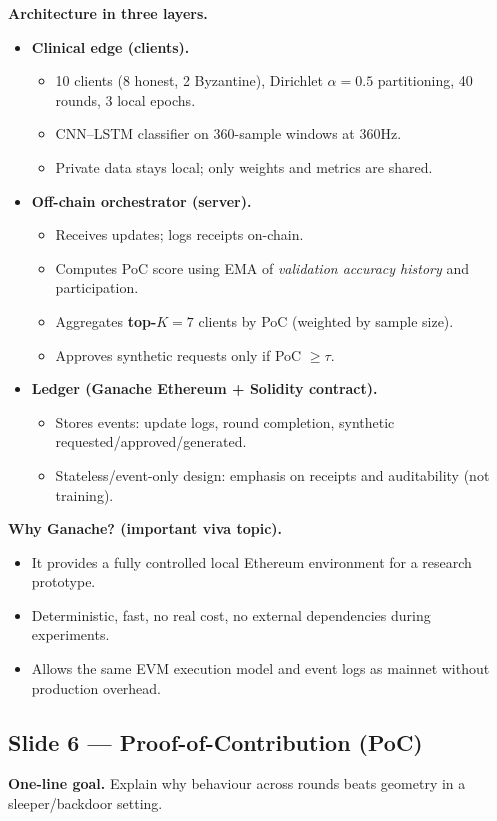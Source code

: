 \documentclass[11pt,a4paper]{article}
\begin{document}
\textbf{Architecture in three layers.}
\begin{itemize}
\item \textbf{Clinical edge (clients).}
  \begin{itemize}
  \item 10 clients (8 honest, 2 Byzantine), Dirichlet $\alpha=0.5$ partitioning, 40 rounds, 3 local epochs.
  \item CNN--LSTM classifier on 360-sample windows at 360Hz.
  \item Private data stays local; only weights and metrics are shared.
  \end{itemize}
\item \textbf{Off-chain orchestrator (server).}
  \begin{itemize}
  \item Receives updates; logs receipts on-chain.
  \item Computes PoC score using EMA of \emph{validation accuracy history} and participation.
  \item Aggregates \textbf{top-$K=7$} clients by PoC (weighted by sample size).
  \item Approves synthetic requests only if PoC $\ge \tau$.
  \end{itemize}
\item \textbf{Ledger (Ganache Ethereum + Solidity contract).}
  \begin{itemize}
  \item Stores events: update logs, round completion, synthetic requested/approved/generated.
  \item Stateless/event-only design: emphasis on receipts and auditability (not training).
  \end{itemize}
\end{itemize}

\textbf{Why Ganache? (important viva topic).}
\begin{itemize}
\item It provides a fully controlled local Ethereum environment for a research prototype.
\item Deterministic, fast, no real cost, no external dependencies during experiments.
\item Allows the same EVM execution model and event logs as mainnet without production overhead.
\end{itemize}

\subsection{Slide 6 --- Proof-of-Contribution (PoC)}
\textbf{One-line goal.} Explain why behaviour across rounds beats geometry in a sleeper/backdoor setting.
\end{document}
